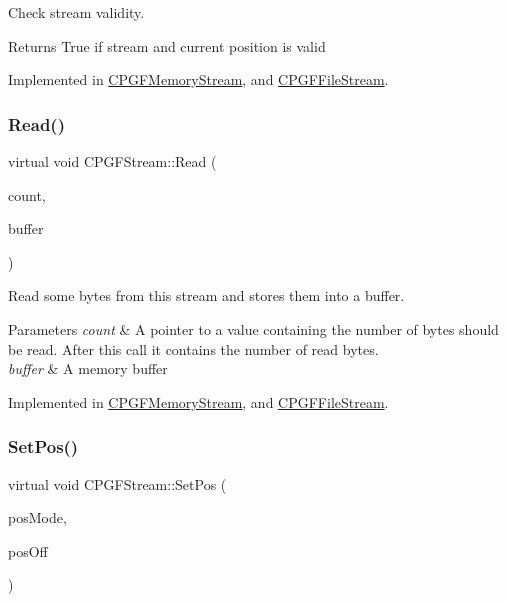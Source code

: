 Check stream validity. \begin{DoxyReturn}{Returns}
True if stream and current position is valid 
\end{DoxyReturn}


Implemented in \mbox{\hyperlink{classCPGFMemoryStream_a5eb1f2ee69815d63fa764b100d883655}{C\+P\+G\+F\+Memory\+Stream}}, and \mbox{\hyperlink{classCPGFFileStream_a999b6c0ebc670ea58f5e34729e7f323a}{C\+P\+G\+F\+File\+Stream}}.

\mbox{\label{classCPGFStream_afdc81fe9b4d2d962b8112e50eace95a2}} 
\subsubsection{\texorpdfstring{Read()}{Read()}}
{\footnotesize\ttfamily virtual void C\+P\+G\+F\+Stream\+::\+Read (\begin{DoxyParamCaption}\item[{int $\ast$}]{count,  }\item[{void $\ast$}]{buffer }\end{DoxyParamCaption})\hspace{0.3cm}{\ttfamily [pure virtual]}}

Read some bytes from this stream and stores them into a buffer. 
\begin{DoxyParams}{Parameters}
{\em count} & A pointer to a value containing the number of bytes should be read. After this call it contains the number of read bytes. \\
\hline
{\em buffer} & A memory buffer \\
\hline
\end{DoxyParams}


Implemented in \mbox{\hyperlink{classCPGFMemoryStream_a4cf0499309d901fcdcd9282a7351d24d}{C\+P\+G\+F\+Memory\+Stream}}, and \mbox{\hyperlink{classCPGFFileStream_a3ff32003518e1d996cc8af33c5bbbfaf}{C\+P\+G\+F\+File\+Stream}}.

\mbox{\label{classCPGFStream_a69be67d4b04cd056c4f74d8147349a16}} 
\subsubsection{\texorpdfstring{SetPos()}{SetPos()}}
{\footnotesize\ttfamily virtual void C\+P\+G\+F\+Stream\+::\+Set\+Pos (\begin{DoxyParamCaption}\item[{short}]{pos\+Mode,  }\item[{I\+N\+T64}]{pos\+Off }\end{DoxyParamCaption})\hspace{0.3cm}{\ttfamily [pure virtual]}}

